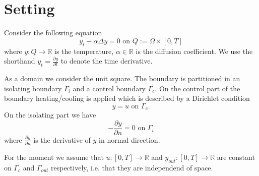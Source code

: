\documentclass[
12pt, %
a4paper, %
onecolumn, %
portrait %
]{article}
\begin{document}
\pagestyle{myheadings} %
\markright{\doctitle} %


\thispagestyle{plain} %

\printtitle %

\section{Setting}
Consider the following equation
\begin{equation}
y_t -  \alpha \Delta y = 0 \text{ on } Q := \Omega \times [0,T]
\label{eq:pde}
\end{equation}
where $y : Q \rightarrow \mathbb{R}$ is the temperature, $\alpha \in \mathbb{R}$ is the diffusion coefficient. We use the shorthand $y_t = \frac{\partial y}{\partial t}$ to denote the time derivative.
 
As a domain we consider the unit square. The boundary is partitioned in an isolating boundary $\Gamma_i$ and a control boundary $\Gamma_c$.
On the control part of the boundary heating/cooling is applied which is described by a Dirichlet condition
\begin{equation}
y = u \text{ on } \Gamma_c.
\end{equation}
On the isolating part we have
\begin{equation}
- \frac{\partial y}{\partial n} = 0 \text{ on } \Gamma_i
\end{equation}
where $\frac{\partial y}{\partial n}$ is the derivative of $y$ in normal direction.

\begin{center}
\end{center}
For the moment we assume that $u : [0, T] \rightarrow \mathbb{R}$ and $y_{out} : [0,T] \rightarrow \mathbb{R}$ are constant on $\Gamma_c$ and $\Gamma_{out}$ respectively, i.e. that they are independend of space.
\end{document}
